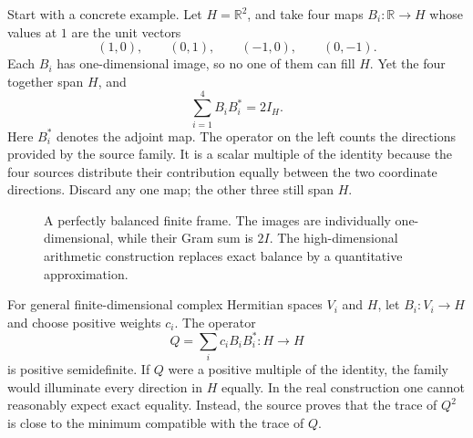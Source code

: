 \documentclass[11pt,openany,oneside]{scrbook}
\theoremstyle{definition}
\theoremstyle{remark}
\newcommand{\RR}{\mathbb R}
\begin{document}
Start with a concrete example.  Let $H=\RR^2$, and take four maps $B_i:\RR\to H$ whose values at $1$ are the unit vectors
\[
(1,0),\qquad(0,1),\qquad(-1,0),\qquad(0,-1).
\]
Each $B_i$ has one-dimensional image, so no one of them can fill $H$.  Yet the four together span $H$, and
\[
\sum_{i=1}^4 B_iB_i^*=2I_H.
\]
Here $B_i^*$ denotes the adjoint map.  The operator on the left counts the directions provided by the source family.  It is a scalar multiple of the identity because the four sources distribute their contribution equally between the two coordinate directions.  Discard any one map; the other three still span $H$.

\begin{figure}[ht]
\centering
{}
\caption{A perfectly balanced finite frame. The images are individually one-dimensional, while their Gram sum is $2I$.  The high-dimensional arithmetic construction replaces exact balance by a quantitative approximation.}
\label{fig:four-vectors}
\end{figure}

For general finite-dimensional complex Hermitian spaces $V_i$ and $H$, let $B_i:V_i\to H$ and choose positive weights $c_i$.  The operator
\begin{equation}\label{eq:frame-Q}
Q=\sum_i c_i B_iB_i^*:H\longrightarrow H
\end{equation}
is positive semidefinite.  If $Q$ were a positive multiple of the identity, the family would illuminate every direction in $H$ equally.  In the real construction one cannot reasonably expect exact equality.  Instead, the source proves that the trace of $Q^2$ is close to the minimum compatible with the trace of $Q$.
\end{document}
